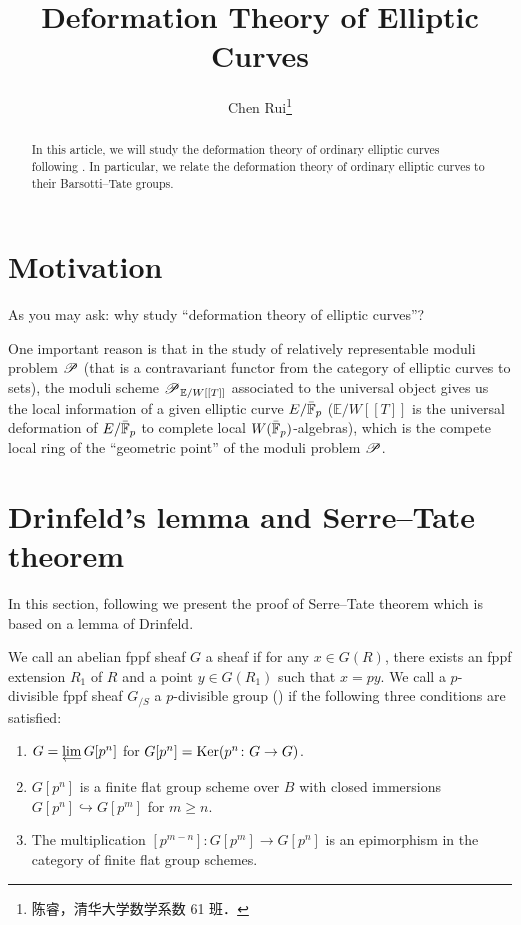 \documentclass[twoside]{article}
\begin{document}
\title{Deformation Theory of Elliptic Curves}
\author{Chen Rui\footnote{陈睿，清华大学数学系数 61 班．}}

\begin{abstract}
In this article,
we will study the deformation theory of ordinary elliptic curves following \cite{Hida}.
In particular, we relate the deformation theory of ordinary elliptic curves to their Barsotti--Tate groups.
\end{abstract}

\section{Motivation}

As you may ask: why study ``deformation theory of elliptic curves''?

One important reason is that in the study of relatively representable moduli problem $\mathscr{P}$
(that is a contravariant functor from the category of elliptic curves to sets),
the moduli scheme $\mathscr{P}_{\,\mathbb{E}/W[[T]]}$ associated to the universal object
gives us the local information of a given elliptic curve
$E/\bar{\mathbb{F}}_{p}$ ($\mathbb{E}/W[[T]]$ is the universal deformation
of $E/\bar{\mathbb{F}}_{p}$ to complete local $W(\bar{\mathbb{F}}_{p})$-algebras),
which is the compete local ring of the ``geometric point'' of the moduli problem $\mathscr{P}$.

\section{Drinfeld's lemma and Serre--Tate theorem}

In this section, following \cite{Katz} we present the proof of Serre--Tate theorem which is based on a lemma of Drinfeld.

\begin{definition}
    We call an abelian fppf sheaf $G$ a  sheaf if for any $x\in G(R)$,
    there exists an fppf extension $R_{1}$ of $R$ and a point $y\in G(R_{1})$ such that $x=py$.
    We call a $p$-divisible fppf sheaf $G_{/S}$ a $p$-divisible group 
    \textup{()} if the following three conditions are satisfied:
    \begin{enumerate}
        \item $G=\liminv G[p^{n}]$ for  $G[p^{n}]=\operatorname{Ker}(p^{n}\colon G \to G)$.
        \item $G[p^{n}]$ is a finite flat group scheme over $B$ 
        with closed immersions $G[p^{n}] \hookrightarrow G[p^{m}]$ for $m\ge n$.
        \item The multiplication $[p^{m-n}]\colon G[p^{m}]\to G[p^{n}]$ is 
        an epimorphism in the category of finite flat group schemes.
    \end{enumerate}
\end{definition}
\end{document}
